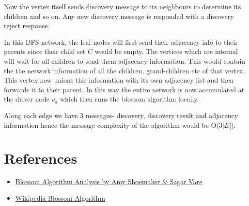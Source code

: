 Now the vertex itself sends discovery message to its neighbours to determine its children and so on. Any new discovery message is responded with a discovery reject response.

In this DFS network, the leaf nodes will first send their adjacency info to their parents since their child set $C$ would be empty. The vertices which are internal will wait for all children to send them adjacency information. This would contain the the network information of all the children, grand-children etc of that vertex. This vertex now unions this information with its own adjacency list and then forwards it to their parent. In this way the entire network is now accumulated at the driver node $v_a$ which then runs the blossom algorithm locally.

Along each edge we have 3 messages- discovery, discovery result and adjacency information hence the message complexity of the algorithm would be O($3|E|$).



\section{References}
\begin{itemize}
    \item \href{https://stanford.edu/~rezab/classes/cme323/S16/projects_reports/shoemaker_vare.pdf}{\color{blue} Blossom Algorithm Analysis by Amy Shoemaker \& Sagar Vare}
    \item \href{https://en.wikipedia.org/wiki/Blossom_algorithm}{\color{blue} Wikipedia Blossom Algorithm}
\end{itemize}



%
